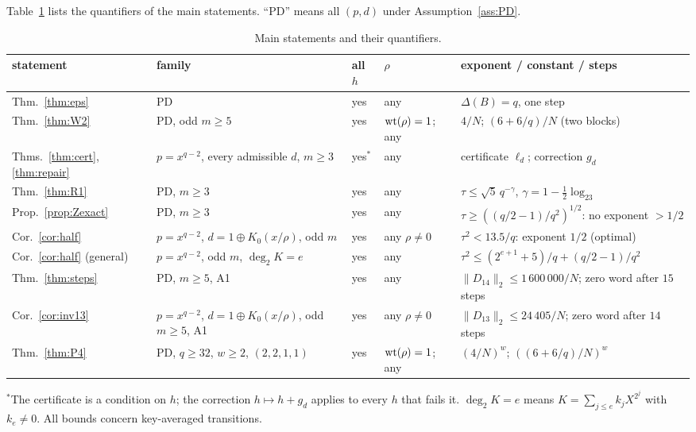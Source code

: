 Table~\ref{tab:main} lists the quantifiers of the main statements. ``PD'' means all $(p,d)$ under Assumption~\ref{ass:PD}.
\begin{table}[ht]\footnotesize\setlength{\tabcolsep}{3pt}
\caption{Main statements and their quantifiers.}\label{tab:main}
\begin{tabular}{p{}p{}p{}p{}p{}}
\toprule
statement & family & all $h$ & $\rho$ & exponent / constant / steps\\
\midrule
Thm.~\ref{thm:eps} & PD & yes & any & $\Delta(B)=q$, one step\\
Thm.~\ref{thm:W2} & PD, odd $m\ge5$ & yes & $\mathrm{wt}(\rho)=1$; any & $4/N$; $(6+6/q)/N$ (two blocks)\\
Thms.~\ref{thm:cert}, \ref{thm:repair} & $p=x^{q-2}$, every admissible $d$, $m\ge3$ & yes$^\ast$ & any & certificate $\ell_d$; correction $g_d$\\
Thm.~\ref{thm:R1} & PD, $m\ge3$ & yes & any & $\tau\le\sqrt5\,q^{-\gamma}$, $\gamma=1-\frac12\log_23$\\
Prop.~\ref{prop:Zexact} & PD, $m\ge3$ & yes & any & $\tau\ge((q/2-1)/q^2)^{1/2}$: no exponent $>1/2$\\
Cor.~\ref{cor:half} & $p=x^{q-2}$, $d=1\oplus K_0(x/\rho)$, odd $m$ & yes & any $\rho\ne0$ & $\tau^2<13.5/q$: exponent $1/2$ (optimal)\\
Cor.~\ref{cor:half} (general) & $p=x^{q-2}$, odd $m$, $\deg_2K=e$ & yes & any & $\tau^2\le(2^{e+1}+5)/q+(q/2-1)/q^2$\\
Thm.~\ref{thm:steps} & PD, $m\ge5$, A1 & yes & any & $\|D_{14}\|_2\le1\,600\,000/N$; zero word after $15$ steps\\
Cor.~\ref{cor:inv13} & $p=x^{q-2}$, $d=1\oplus K_0(x/\rho)$, odd $m\ge5$, A1 & yes & any $\rho\ne0$ & $\|D_{13}\|_2\le24\,405/N$; zero word after $14$ steps\\
Thm.~\ref{thm:P4} & PD, $q\ge32$, $w\ge2$, $(2,2,1,1)$ & yes & $\mathrm{wt}(\rho)=1$; any & $(4/N)^w$; $((6+6/q)/N)^w$\\
\bottomrule
\end{tabular}

\smallskip
{\footnotesize $^\ast$The certificate is a condition on $h$; the correction $h\mapsto h+g_d$ applies to every $h$ that fails it.
$\deg_2K=e$ means $K=\sum_{j\le e}k_jX^{2^j}$ with $k_e\ne0$. All bounds concern key-averaged transitions.}
\end{table}

